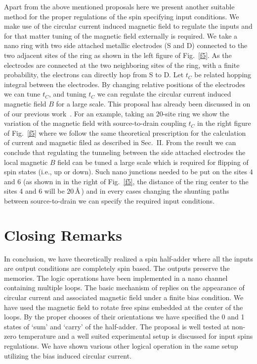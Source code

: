\documentclass[prb,aps,twocolumn,amsmath,amssymb,floatfix,superscriptaddress]{revtex4}
\begin{document}
Apart from the above mentioned proposals here we present another suitable method for the proper regulations
of the spin specifying input conditions. We make use of the circular current induced magnetic field to
regulate the inputs and for that matter tuning of the magnetic field externally is required.
We take a nano ring with two side attached metallic electrodes (S and D) connected
to the two adjacent sites of the ring as shown in the left figure of Fig.~\ref{f5}.
As the electrodes are connected at the two neighboring sites of the ring,
with a finite probability, the electrons can directly hop from S to D. Let $t_C$ be
related hopping integral between the electrodes. By changing relative positions of the
electrodes we can tune $t_C$, and tuning $t_C$ we can regulate the circular current
induced magnetic field $B$ for a large scale. This proposal has already been discussed
in on of our previous work~\cite{ref21}. For an example, taking an 20-site ring we
show the variation of
the magnetic field with source-to-drain coupling $t_C$ in the right figure
of Fig.~\ref{f5} where we follow the same theoretical prescription for the calculation
of current and magnetic filed as described in Sec.~II. From the result we can conclude
that regulating the tunneling between the side attached electrodes the local magnetic $B$
field can be tuned a large scale which is required for flipping of spin states (i.e., up or
down). Such nano junctions needed to be put on the sites 4 and 6 (as shown in
in the right of Fig.~\ref{f5}, the distance of the ring center to the sites 4 and 6
will be $20\,$\AA$\,$) and in every cases changing the shunting paths between
source-to-drain we can specify the required input conditions.

\section{Closing Remarks}

In conclusion, we have theoretically realized a spin half-adder where all the
inputs are output conditions are completely spin based. The outputs preserve the
memories. The logic operations have been implemented in a nano channel containing multiple
loops. The basic mechanism of replies on the appearance
of circular current and associated magnetic field under a finite bias condition.
We have used the magnetic field to rotate free spins embedded at the center of the loops.
By the proper chooses of their orientations we have specified the 0 and 1 states of `sum' and
`carry' of the half-adder. The proposal is well tested at non-zero temperature and a well
suited experimental setup is discussed for input spins regulations. We have
shown various other logical operation in the same setup utilizing the bias induced circular
current.
\end{document}
